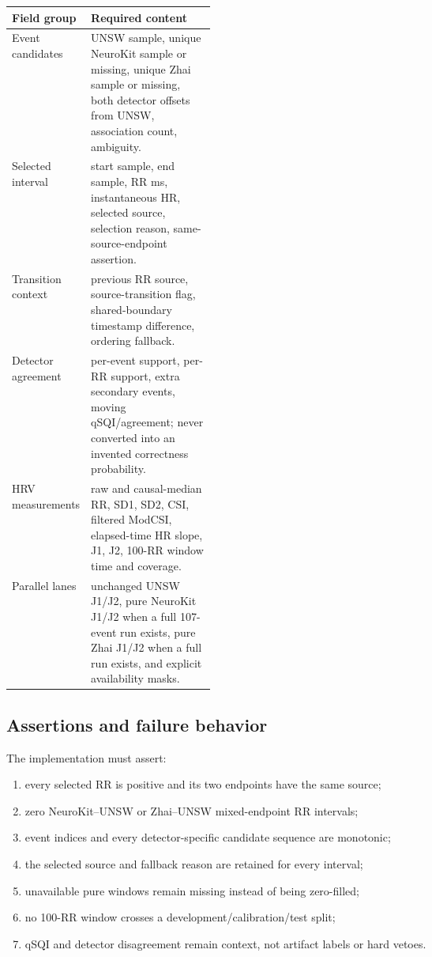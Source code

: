 \documentclass[10pt]{article}
\begin{document}
\begin{table}[H]
\centering
\begin{tabularx}{\linewidth}{p{0.30\linewidth}X}
\toprule
Field group & Required content \\
\midrule
Event candidates & UNSW sample, unique NeuroKit sample or missing, unique Zhai sample or missing, both detector offsets from UNSW, association count, ambiguity. \\
Selected interval & start sample, end sample, RR ms, instantaneous HR, selected source, selection reason, same-source-endpoint assertion. \\
Transition context & previous RR source, source-transition flag, shared-boundary timestamp difference, ordering fallback. \\
Detector agreement & per-event support, per-RR support, extra secondary events, moving qSQI/agreement; never converted into an invented correctness probability. \\
HRV measurements & raw and causal-median RR, SD1, SD2, CSI, filtered ModCSI, elapsed-time HR slope, J1, J2, 100-RR window time and coverage. \\
Parallel lanes & unchanged UNSW J1/J2, pure NeuroKit J1/J2 when a full 107-event run exists, pure Zhai J1/J2 when a full run exists, and explicit availability masks. \\
\bottomrule
\end{tabularx}
\end{table}

\subsection{Assertions and failure behavior}

The implementation must assert:
\begin{enumerate}
\item every selected RR is positive and its two endpoints have the same source;
\item zero NeuroKit--UNSW or Zhai--UNSW mixed-endpoint RR intervals;
\item event indices and every detector-specific candidate sequence are monotonic;
\item the selected source and fallback reason are retained for every interval;
\item unavailable pure windows remain missing instead of being zero-filled;
\item no 100-RR window crosses a development/calibration/test split;
\item qSQI and detector disagreement remain context, not artifact labels or hard vetoes.
\end{enumerate}
\end{document}
